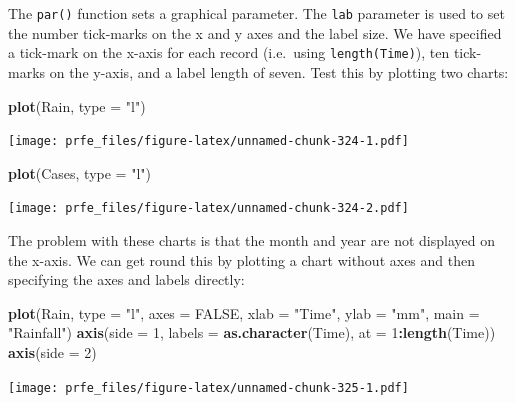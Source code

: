 \documentclass[12pt,a4paper]{book}
\newenvironment{Shaded}{\begin{snugshade}}{\end{snugshade}}
\newcommand{\KeywordTok}[1]{\textcolor[rgb]{0.13,0.29,0.53}{\textbf{#1}}}
\newcommand{\DataTypeTok}[1]{\textcolor[rgb]{0.13,0.29,0.53}{#1}}
\newcommand{\DecValTok}[1]{\textcolor[rgb]{0.00,0.00,0.81}{#1}}
\newcommand{\StringTok}[1]{\textcolor[rgb]{0.31,0.60,0.02}{#1}}
\newcommand{\OtherTok}[1]{\textcolor[rgb]{0.56,0.35,0.01}{#1}}
\newcommand{\OperatorTok}[1]{\textcolor[rgb]{0.81,0.36,0.00}{\textbf{#1}}}
\newcommand{\NormalTok}[1]{#1}
\theoremstyle{definition}
\theoremstyle{definition}
\theoremstyle{definition}
\theoremstyle{remark}
\begin{document}
The \texttt{par()} function sets a graphical parameter. The \texttt{lab}
parameter is used to set the number tick-marks on the x and y axes and
the label size. We have specified a tick-mark on the x-axis for each
record (i.e.~using \texttt{length(Time)}), ten tick-marks on the y-axis,
and a label length of seven. Test this by plotting two charts:

\begin{Shaded}
\begin{Highlighting}[]
\KeywordTok{plot}\NormalTok{(Rain, }\DataTypeTok{type =} \StringTok{"l"}\NormalTok{)}
\end{Highlighting}
\end{Shaded}

\texttt{[image: prfe\_files/figure-latex/unnamed-chunk-324-1.pdf]}

\begin{Shaded}
\begin{Highlighting}[]
\KeywordTok{plot}\NormalTok{(Cases, }\DataTypeTok{type =} \StringTok{"l"}\NormalTok{)}
\end{Highlighting}
\end{Shaded}

\texttt{[image: prfe\_files/figure-latex/unnamed-chunk-324-2.pdf]}

The problem with these charts is that the month and year are not
displayed on the x-axis. We can get round this by plotting a chart
without axes and then specifying the axes and labels directly:

\begin{Shaded}
\begin{Highlighting}[]
\KeywordTok{plot}\NormalTok{(Rain, }\DataTypeTok{type =} \StringTok{"l"}\NormalTok{, }\DataTypeTok{axes =} \OtherTok{FALSE}\NormalTok{, }\DataTypeTok{xlab =} \StringTok{"Time"}\NormalTok{, }\DataTypeTok{ylab =} \StringTok{"mm"}\NormalTok{, }\DataTypeTok{main =} \StringTok{"Rainfall"}\NormalTok{)}
\KeywordTok{axis}\NormalTok{(}\DataTypeTok{side =} \DecValTok{1}\NormalTok{, }\DataTypeTok{labels =} \KeywordTok{as.character}\NormalTok{(Time), }\DataTypeTok{at =} \DecValTok{1}\OperatorTok{:}\KeywordTok{length}\NormalTok{(Time))}
\KeywordTok{axis}\NormalTok{(}\DataTypeTok{side =} \DecValTok{2}\NormalTok{)}
\end{Highlighting}
\end{Shaded}

\texttt{[image: prfe\_files/figure-latex/unnamed-chunk-325-1.pdf]}
\end{document}
